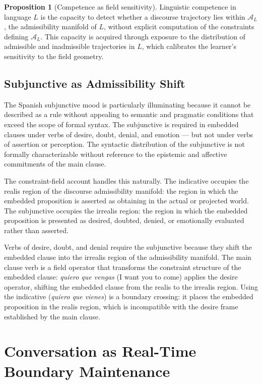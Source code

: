 \documentclass[11pt, a4paper]{article}
\theoremstyle{definition}
\newtheorem{proposition}{Proposition}
\theoremstyle{remark}
\begin{document}
\begin{proposition}[Competence as field sensitivity]
Linguistic competence in language $L$ is the capacity to detect whether a
discourse trajectory lies within $\mathcal{A}_L$, the admissibility manifold
of $L$, without explicit computation of the constraints defining $\mathcal{A}_L$.
This capacity is acquired through exposure to the distribution of admissible
and inadmissible trajectories in $L$, which calibrates the learner's
sensitivity to the field geometry.
\end{proposition}

\subsection{Subjunctive as Admissibility Shift}

The Spanish subjunctive mood is particularly illuminating because it cannot
be described as a rule without appealing to semantic and pragmatic conditions
that exceed the scope of formal syntax. The subjunctive is required in
embedded clauses under verbs of desire, doubt, denial, and emotion --- but
not under verbs of assertion or perception. The syntactic distribution of the
subjunctive is not formally characterizable without reference to the epistemic
and affective commitments of the main clause.

The constraint-field account handles this naturally. The indicative occupies
the realis region of the discourse admissibility manifold: the region in which
the embedded proposition is asserted as obtaining in the actual or projected
world. The subjunctive occupies the irrealis region: the region in which the
embedded proposition is presented as desired, doubted, denied, or emotionally
evaluated rather than asserted.

Verbs of desire, doubt, and denial require the subjunctive because they shift
the embedded clause into the irrealis region of the admissibility manifold.
The main clause verb is a field operator that transforms the constraint
structure of the embedded clause: \textit{quiero que vengas} (I want you to
come) applies the desire operator, shifting the embedded clause from the realis
to the irrealis region. Using the indicative (\textit{quiero que vienes}) is
a boundary crossing: it places the embedded proposition in the realis region,
which is incompatible with the desire frame established by the main clause.

\section{Conversation as Real-Time Boundary Maintenance}
\end{document}
